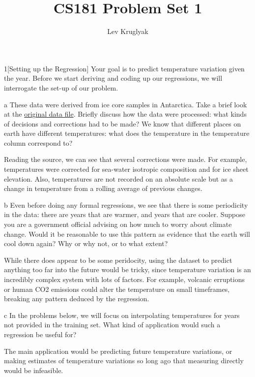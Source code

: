 \documentclass[expanded]{lkx_pset}
\title{CS181 Problem Set 1}
\author{Lev Kruglyak}
\begin{document}
\maketitle

\begin{problem}{1}[Setting up the Regression]
Your goal is to predict temperature variation given the year.  Before we start deriving and coding up our regressions, we will interrogate the set-up of our problem.
\end{problem}

\begin{parts}
	\begin{part}{a}
		These data were derived from ice core samples in Antarctica.
		Take a brief look at the
		\href{https://www.ncei.noaa.gov/pub/data/paleo/icecore/antarctica/epica_domec/edc3deuttemp2007.txt}{original
			data file}. Briefly discuss how the data were processed: what kinds of
		decisions and corrections had to be made?  We know that different
		places on earth have different temperatures: what does the
		temperature in the temperature column correspond to?
	\end{part}

	Reading the source, we can see that several corrections were made. For example, temperatures were corrected for sea-water isotropic composition and for ice sheet elevation. Also, temperatures are not recorded on an absolute scale but as a change in temperature from a rolling average of previous changes.

	\begin{part}{b}
		Even before doing any formal regressions, we see that there is
		some periodicity in the data: there are years that are warmer, and
		years that are cooler.  Suppose you are a government official
		advising on how much to worry about climate change.  Would it be
		reasonable to use this pattern as evidence that the earth will
		cool down again?  Why or why not, or to what extent?
	\end{part}

	While there does appear to be some peridocity, using the dataset to predict anything too far into the future would be tricky, since temperature variation is an incredibly complex system with lots of factors. For example, volcanic erruptions or human CO2 emissions could alter the temperature on small timeframes, breaking any pattern deduced by the regression.

	\begin{part}{c}
		In the problems below, we will focus on interpolating
		temperatures for years not provided in the training set.  What
		kind of application would such a regression be useful for?
	\end{part}

	The main application would be predicting future temperature variations, or making estimates of temperature variations so long ago that measuring directly would be infeasible.
\end{parts}
\end{document}
